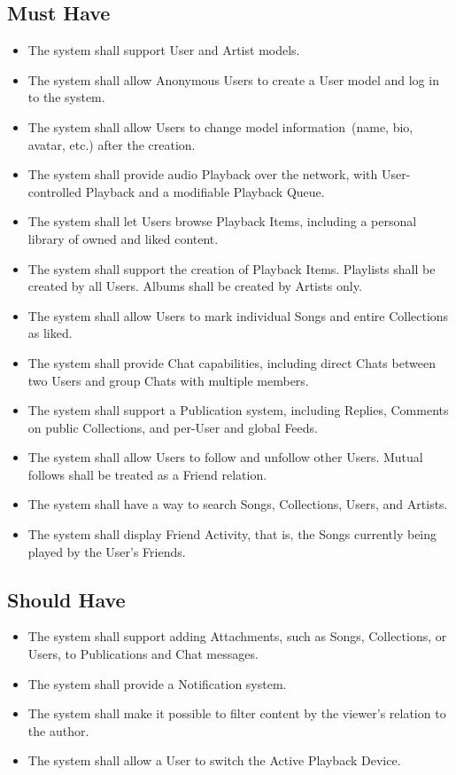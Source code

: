 \subsection*{Must Have}
\begin{itemize}
    \item The system shall support User and Artist models.
    \item The system shall allow Anonymous Users to create a User model and log in to the system.
    \item The system shall allow Users to change model information~(name, bio, avatar, etc.) after the creation.
    \item The system shall provide audio Playback over the network, with User-controlled Playback and a modifiable Playback Queue.
    \item The system shall let Users browse Playback Items, including a personal library of owned and liked content.
    \item The system shall support the creation of Playback Items.
    Playlists shall be created by all Users.
    Albums shall be created by Artists only.
    \item The system shall allow Users to mark individual Songs and entire Collections as liked.
    \item The system shall provide Chat capabilities, including direct Chats between two Users and group Chats with multiple members.
    \item The system shall support a Publication system, including Replies, Comments on public Collections, and per-User and global Feeds.
    \item The system shall allow Users to follow and unfollow other Users.
    Mutual follows shall be treated as a Friend relation.
    \item The system shall have a way to search Songs, Collections, Users, and Artists.
    \item The system shall display Friend Activity, that is, the Songs currently being played by the User's Friends.
\end{itemize}

\subsection*{Should Have}
\begin{itemize}
    \item The system shall support adding Attachments, such as Songs, Collections, or Users, to Publications and Chat messages.
    \item The system shall provide a Notification system.
    \item The system shall make it possible to filter content by the viewer's relation to the author.
    \item The system shall allow a User to switch the Active Playback Device.
\end{itemize}


